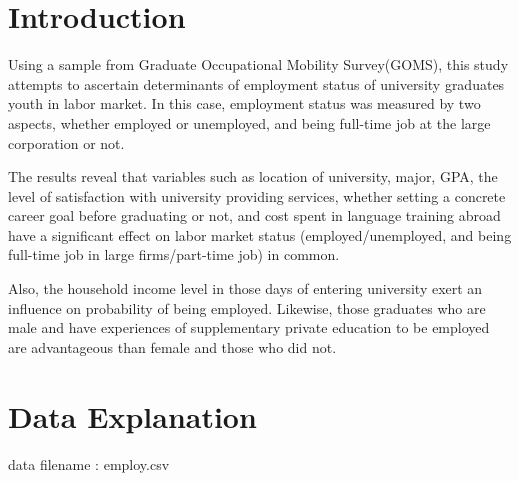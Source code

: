 \documentclass[
]{book}
\begin{document}
\hypertarget{introduction}{%
\section{Introduction}\label{introduction}}

Using a sample from Graduate Occupational Mobility Survey(GOMS),
this study attempts to ascertain determinants of employment status of university graduates youth in labor market. In this case, employment status was
measured by two aspects, whether employed or unemployed, and being full-time
job at the large corporation or not.

The results reveal that variables such as location of university, major, GPA, the level of satisfaction with university providing services, whether setting a concrete career goal before graduating or not, and cost spent in language training abroad have a significant effect on labor market status (employed/unemployed, and being full-time job in large firms/part-time job) in common.

Also, the household income level in those days of entering university exert an influence on probability of being employed. Likewise, those graduates who are male and have experiences of supplementary private education to be employed are advantageous than female and those who did not.

\hypertarget{data-explanation}{%
\section{Data Explanation}\label{data-explanation}}

data filename : employ.csv
\end{document}
